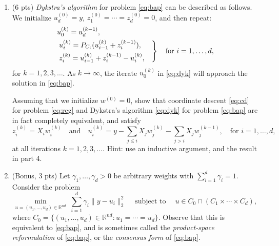 \documentclass{article}
\theoremstyle{remark}
\theoremstyle{definition}
\newcommand{\st}{\mathop{\mathrm{subject\,\,to}}}
\def\R{\mathbb{R}}
\begin{document}
\begin{enumerate}
\item (6 pts) {\it Dykstra's algorithm} for problem \eqref{eq:bap} can be
  described as follows.  We initialize $u_d^{(0)}=y$,
  $z_1^{(0)}=\cdots=z_d^{(0)}=0$, and then repeat:  
  \begin{equation}
    \begin{aligned}
      \label{eq:dyk}
      &u_0^{(k)} = u_d^{(k-1)}, \\
      &\begin{rcases*}
        u_i^{(k)} = P_{C_i} (u_{i-1}^{(k)} + z_i^{(k-1)}), & \\
        z_i^{(k)} = u_{i-1}^{(k)} + z_i^{(k-1)} - u_i^{(k)}, &
      \end{rcases*}
      \quad \text{for $i=1,\ldots,d$},
    \end{aligned}
  \end{equation}
  for $k=1,2,3,\ldots$.  As $k \to \infty$, the iterate $u_0^{(k)}$ in
  \eqref{eq:dyk} will approach the solution in \eqref{eq:bap}.

  Assuming that we initialize $w^{(0)}=0$, show that coordinate descent
  \eqref{eq:cd} for problem \eqref{eq:reg} and Dykstra's algorithm
  \eqref{eq:dyk} for problem \eqref{eq:bap} are in fact completely equivalent,
  and satisfy  
  $$
  z_i^{(k)} = X_iw_i^{(k)} \quad\text{and}\quad
  u_i^{(k)}=y - \sum_{j \leq i} X_j w_j^{(k)} - \sum_{j > i} X_j  
  w_j^{(k-1)}, \quad\text{for $i=1,\ldots,d$},
  $$
  at all iterations $k=1,2,3,\ldots$.  Hint: use an inductive argument, and the
  result in part 4.

\item (Bonus, 3 pts) Let $\gamma_1,\ldots,\gamma_d>0$ be arbitrary weights with   
  $\sum_{i=1}^d \gamma_i = 1$.  Consider the problem
  \begin{equation}
    \label{eq:bap_prod}
    \min_{u=(u_1,\ldots,u_d) \in \R^{nd}} \; \sum_{i=1}^d \gamma_i
    \|y-u_i\|_2^2  
    \quad \st \quad u \in C_0 \cap (C_1 \times \cdots \times C_d), 
  \end{equation}
  where $C_0=\{ (u_1,\ldots,u_d) \in \R^{nd} : u_1=\cdots=u_d\}$.  Observe that
  this is equivalent to \eqref{eq:bap}, and is sometimes called the {\it
    product-space reformulation} of \eqref{eq:bap}, or the {\it consensus form}
  of \eqref{eq:bap}. 


\end{enumerate}
\end{document}
